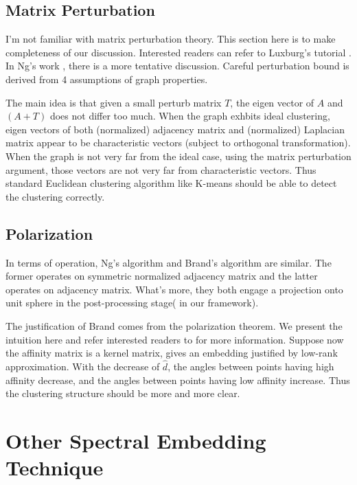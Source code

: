 \subsection{Matrix Perturbation}
\label{sec:mper}

I'm not familiar with matrix perturbation theory. This section 
here is to make completeness of our discussion. Interested 
readers can refer to Luxburg's tutorial 
\cite{von2007tutorial}. In Ng's work \cite{ng2002spectral}, 
there is a more tentative discussion. Careful perturbation 
bound is derived from 4 assumptions of graph properties. 

The main idea is that given a small perturb matrix $ T $, 
the eigen vector of $ A $ and $ (A+T) $ does not differ too much. 
When the graph exhbits ideal clustering, eigen vectors of 
both (normalized) adjacency\cite{ng2002spectral}
matrix and (normalized) Laplacian\cite{von2007tutorial} matrix appear
to be characteristic vectors (subject to orthogonal transformation).
When the graph is not very far from the ideal case, using 
the matrix perturbation argument, those vectors are not very far from 
characteristic vectors. Thus standard Euclidean clustering algorithm 
like K-means should be able to detect the clustering correctly. 

\subsection{Polarization}

In terms of operation, Ng's algorithm \cite{ng2002spectral}
and Brand's algorithm \cite{brand2003unifying} are similar. 
The former operates on symmetric normalized adjacency matrix 
and the latter operates on adjacency matrix. What's more, 
they both engage a projection onto unit sphere in the post-processing 
stage(\rsec{\ref{sec:postproc}} in our framework). 

The justification of Brand comes from the polarization theorem. 
We present the intuition here and refer interested readers to 
\cite{brand2003unifying} for more information. 
Suppose now the affinity matrix is a kernel matrix, 
\req{\ref{eq:lrapprox}} gives an embedding justified by 
low-rank approximation. With the decrease of $ \hat{d} $, 
the angles between points having high affinity decrease, 
and the angles between points having low affinity increase. 
Thus the clustering structure should be more and more clear. 


\section{Other Spectral Embedding Technique}
\label{sec:nldr}

